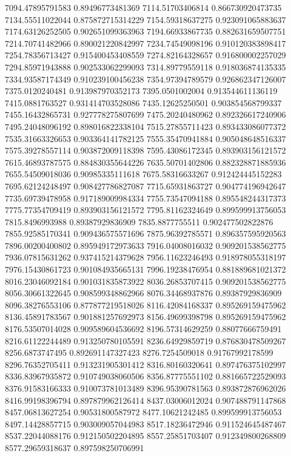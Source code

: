 {7094.47895791583 0.89496773481369
7114.51703406814 0.866730920473735
7134.55511022044 0.875872715314229
7154.59318637275 0.923091065883637
7174.63126252505 0.902651099363963
7194.66933867735 0.882631659507751
7214.70741482966 0.890021220842997
7234.74549098196 0.910120383898417
7254.78356713427 0.915400453408559
7274.82164328657 0.916800002257029
7294.85971943888 0.902533062299093
7314.89779559118 0.918036874135335
7334.93587174349 0.910239100456238
7354.97394789579 0.926862347126007
7375.0120240481 0.913987970352173
7395.0501002004 0.913544611136119
7415.0881763527 0.931414703528086
7435.12625250501 0.903854568799337
7455.16432865731 0.927778275807699
7475.20240480962 0.892326617240906
7495.24048096192 0.898016822338104
7515.27855711423 0.893433086077372
7535.31663326653 0.903364141782125
7555.35470941884 0.905048648516337
7575.39278557114 0.903872009118398
7595.43086172345 0.893903156121572
7615.46893787575 0.884830355644226
7635.50701402806 0.882328871885936
7655.54509018036 0.90985335111618
7675.58316633267 0.912424445152283
7695.62124248497 0.908427786827087
7715.65931863727 0.904774196942647
7735.69739478958 0.917189009984334
7755.73547094188 0.895548244317373
7775.77354709419 0.893903156121572
7795.81162324649 0.899599913756053
7815.8496993988 0.89387929836909
7835.8877755511 0.902477502822876
7855.92585170341 0.909436575571696
7875.96392785571 0.896357595920563
7896.00200400802 0.895949172973633
7916.04008016032 0.909201538562775
7936.07815631262 0.937415214379628
7956.11623246493 0.918978055318197
7976.15430861723 0.901084935665131
7996.19238476954 0.881889681021372
8016.23046092184 0.901031835873922
8036.26853707415 0.909201538562775
8056.30661322645 0.908599348862966
8076.34468937876 0.89387929836909
8096.38276553106 0.877877219518026
8116.42084168337 0.895269159475962
8136.45891783567 0.901881257692973
8156.49699398798 0.895269159475962
8176.53507014028 0.909589604536692
8196.57314629259 0.88077666759491
8216.61122244489 0.913250780105591
8236.64929859719 0.876830478509267
8256.6873747495 0.892691147327423
8276.7254509018 0.91767992178599
8296.76352705411 0.913231905301412
8316.80160320641 0.897476375102997
8336.83967935872 0.910749038060506
8356.87775551102 0.881665722529093
8376.91583166333 0.910073781013489
8396.95390781563 0.893872876962026
8416.99198396794 0.897879962126414
8437.03006012024 0.907488791147868
8457.06813627254 0.90531800587972
8477.10621242485 0.899599913756053
8497.14428857715 0.903009057044983
8517.18236472946 0.911524645487467
8537.22044088176 0.912150502204895
8557.25851703407 0.912349800268809
8577.29659318637 0.897598250706991
}

